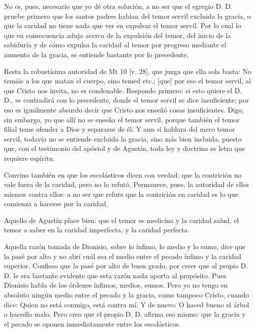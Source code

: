 No es, pues, necesario que yo dé otra solución, a no ser que el egregio D. D. pruebe primero que los santos padres hablan del temor servil excluida la gracia, o que la caridad no tiene nada que ver en expulsar el temor servil. Por lo cual lo que en consecuencia adujo acerca de la expulsión del temor, del inicio de la sabiduría y de cómo expulsa la caridad al temor por progreso mediante el aumento de la gracia, se entiende bastante por lo precedente.

Resta la robustísima autoridad de Mt 10 [v. 28], que juzga que ella sola basta: No temáis a los que matan el cuerpo, sino temed etc.; [que] por eso el temor servil, al que Cristo nos invita, no es condenable. Respondo primero: si esto quiere el D. D., se contradirá con lo precedente, donde el temor servil se dice insuficiente; por eso es igualmente absurdo decir que Cristo nos enseñó cosas insuficientes. Digo, sin embargo, yo que allí no se enseña el temor servil, porque también el temor filial teme ofender a Dios y separarse de él. Y aun si hablara del mero temor servil, todavía no se entiende excluida la gracia, sino más bien incluida, puesto que, con el testimonio del apóstol y de Agustín, toda ley y doctrina es letra que requiere espíritu.

Convino también en que los escolásticos dicen con verdad: que la contrición no vale fuera de la caridad, pero no lo refutó. Permanece, pues, la autoridad de ellos mismos contra ellos: a no ser que refute que la contrición en caridad es lo que comienza a hacerse por la caridad.

Aquello de Agustín place bien: que el temor es medicina y la caridad salud, el temor a saber en la caridad imperfecta, y la caridad perfecta.

Aquella razón tomada de Dionisio, sobre lo ínfimo, lo medio y lo sumo, dice que la pasé por alto y no abrí cuál sea el medio entre el pecado ínfimo y la caridad superior. Confieso que la pasé por alto de buen grado, por creer que al propio D. D. le era bastante evidente que esta razón nada aporta al propósito. Pues Dionisio habla de los órdenes ínfimos, medios, sumos. Pero yo no tengo en absoluto ningún medio entre el pecado y la gracia, como tampoco Cristo, cuando dice: Quien no está conmigo, está contra mí. Y de nuevo: O haced bueno el árbol o hacedlo malo. Pero creo que el propio D. D. afirma eso mismo: que la gracia y el pecado se oponen inmediatamente entre los escolásticos.

